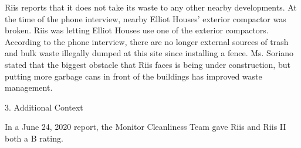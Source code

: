 Riis reports that it does not take its waste to any other nearby developments. At the time of the phone interview, nearby Elliot Houses' exterior compactor was broken. Riis was letting Elliot Houses use one of the exterior compactors. According to the phone interview, there are no longer external sources of trash and bulk waste illegally dumped at this site since installing a fence. Ms. Soriano stated that the biggest obstacle that Riis faces is being under construction, but putting more garbage cans in front of the buildings has improved waste management.  

3. Additional Context

In a June 24, 2020 report, the Monitor Cleanliness Team gave Riis and Riis II both a B rating.